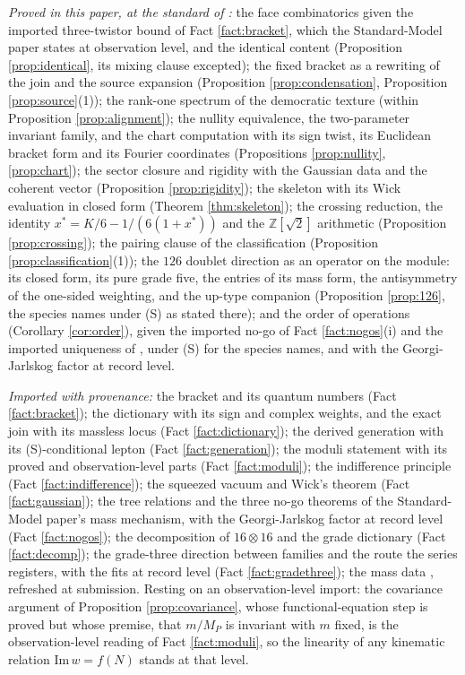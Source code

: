 \documentclass[11pt]{article}
\theoremstyle{definition}
\begin{document}
\emph{Proved in this paper, at the standard of \cite{ButlerT1}:} the face combinatorics given the imported three-twistor bound of Fact \ref{fact:bracket}, which the Standard-Model paper states at observation level, and the identical content (Proposition \ref{prop:identical}, its mixing clause excepted); the fixed bracket as a rewriting of the join and the source expansion (Proposition \ref{prop:condensation}, Proposition \ref{prop:source}(1)); the rank-one spectrum of the democratic texture (within Proposition \ref{prop:alignment}); the nullity equivalence, the two-parameter invariant family, and the chart computation with its sign twist, its Euclidean bracket form and its Fourier coordinates (Propositions \ref{prop:nullity}, \ref{prop:chart}); the sector closure and rigidity with the Gaussian data and the coherent vector (Proposition \ref{prop:rigidity}); the skeleton with its Wick evaluation in closed form (Theorem \ref{thm:skeleton}); the crossing reduction, the identity $x^{*} = K/6 - 1/(6(1+x^{*}))$ and the $\mathbb{Z}[\sqrt{2}]$ arithmetic (Proposition \ref{prop:crossing}); the pairing clause of the classification (Proposition \ref{prop:classification}(1)); the $126$ doublet direction as an operator on the module: its closed form, its pure grade five, the entries of its mass form, the antisymmetry of the one-sided weighting, and the up-type companion (Proposition \ref{prop:126}, the species names under (S) as stated there); and the order of operations (Corollary \ref{cor:order}), given the imported no-go of Fact \ref{fact:nogos}(i) and the imported uniqueness of \cite[Prop.~9.32]{ButlerT12}, under (S) for the species names, and with the Georgi-Jarlskog factor at record level.

\emph{Imported with provenance:} the bracket and its quantum numbers (Fact \ref{fact:bracket}); the dictionary with its sign and complex weights, and the exact join with its massless locus (Fact \ref{fact:dictionary}); the derived generation with its (S)-conditional lepton (Fact \ref{fact:generation}); the moduli statement with its proved and observation-level parts (Fact \ref{fact:moduli}); the indifference principle (Fact \ref{fact:indifference}); the squeezed vacuum and Wick's theorem (Fact \ref{fact:gaussian}); the tree relations and the three no-go theorems of the Standard-Model paper's mass mechanism, with the Georgi-Jarlskog factor at record level (Fact \ref{fact:nogos}); the decomposition of $16 \otimes 16$ and the grade dictionary (Fact \ref{fact:decomp}); the grade-three direction between families and the route the series registers, with the fits at record level (Fact \ref{fact:gradethree}); the mass data \cite{PDG2024}, refreshed at submission. Resting on an observation-level import: the covariance argument of Proposition \ref{prop:covariance}, whose functional-equation step is proved but whose premise, that $m/M_{P}$ is invariant with $m$ fixed, is the observation-level reading of Fact \ref{fact:moduli}, so the linearity of any kinematic relation $\mathrm{Im}\,w = f(N)$ stands at that level.
\end{document}
